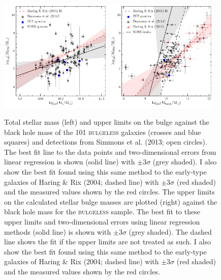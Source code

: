 \documentclass[12pt]{article}
\begin{document}
\begin{figure}
\centering
\includegraphics[width=0.48\textwidth]{mass_bh_total_mass_fit_linmix_fit.pdf}
\includegraphics[width=0.48\textwidth]{mass_bh_bulge_limits_INT_simmons13_measurements_linmix_fit.pdf}
\caption{Total stellar mass (left) and upper limits on the bulge against the black hole mass of the 101 \textsc{bulgeless} galaxies (crosses and blue squares) and detections from Simmons et al. (2013; open circles). The best fit line to the data points and two-dimensional errors from linear regression is shown (solid line) with $\pm3\sigma$ (grey shaded). I also show the best fit found using this same method to the early-type galaxies of Haring \& Rix (2004; dashed line) with $\pm3\sigma$ (red shaded) and the measured values shown by the red circles. The upper limits on the calculated stellar bulge masses are plotted (right) against the black hole mass for the \textsc{bulgeless} sample. The best fit to these upper limits and two-dimensional errors using linear regression methods (solid line) is shown with $\pm3\sigma$ (grey shaded). The dashed line shows the fit if the upper limits are not treated as such. I also show the best fit found using this same method to the early-type galaxies of Haring \& Rix (2004; dashed line) with $\pm3\sigma$ (red shaded) and the measured values shown by the red circles.
}
\label{fig:bulgevsbh}
\end{figure}
\end{document}
